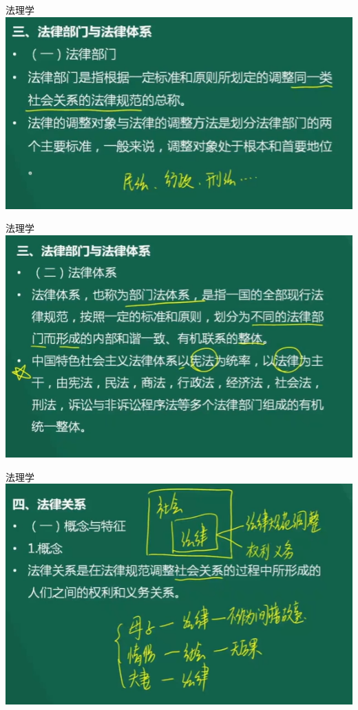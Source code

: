 \documentclass[aspectratio=169]{beamer}
\begin{document}
\begin{frame}[t]{法理学}
    \includegraphics[scale=0.7]{lay_department}\\ 
\end{frame}

\begin{frame}[t]{法理学}
    \includegraphics[scale=0.7]{law_arch}\\ 
\end{frame}

\begin{frame}[t]{法理学}
    \includegraphics[scale=0.7]{law_relation}\\ 
\end{frame}
\end{document}
